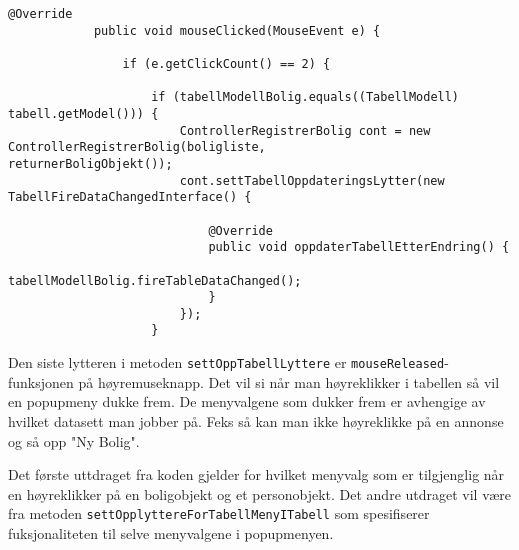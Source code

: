 \begin{lstlisting}[caption=Hendelse ved dobbelklikking på et objekt i tabellen]
			@Override
            public void mouseClicked(MouseEvent e) {

                if (e.getClickCount() == 2) {

                    if (tabellModellBolig.equals((TabellModell) tabell.getModel())) {
                        ControllerRegistrerBolig cont = new ControllerRegistrerBolig(boligliste, 				 returnerBoligObjekt());
                        cont.settTabellOppdateringsLytter(new TabellFireDataChangedInterface() {

                            @Override
                            public void oppdaterTabellEtterEndring() {
                                tabellModellBolig.fireTableDataChanged();
                            }
                        });
                    }
\end{lstlisting}


Den siste lytteren i metoden \texttt{settOppTabellLyttere} er \texttt{mouseReleased}-funksjonen på høyremuseknapp.
Det vil si når man høyreklikker i tabellen så vil en popupmeny dukke frem. De menyvalgene som dukker frem er avhengige av hvilket datasett man jobber på. Feks så kan man ikke høyreklikke på en annonse og så opp "Ny Bolig".

Det første uttdraget fra koden gjelder for hvilket menyvalg som er tilgjenglig når en høyreklikker på en boligobjekt og et personobjekt. 
Det andre utdraget vil være fra metoden \texttt{settOpplyttereForTabellMenyITabell} som spesifiserer fuksjonaliteten til selve menyvalgene i popupmenyen.

